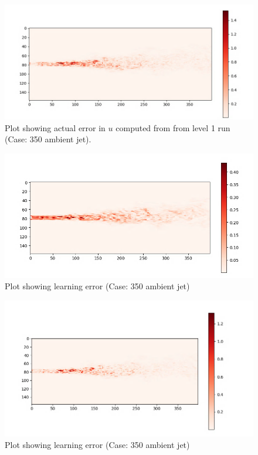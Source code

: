 \documentclass{article}
\begin{document}
\begin{figure}[h!]
    \centering
    \includegraphics[width =0.85\linewidth]{figures/314_01_12_350_12_actual.png}
    \caption{Plot showing actual error in $u$ computed from from level 1 run (Case: 350 ambient jet).}
    \label{amr_err}
\end{figure}

\begin{figure}[h!]
    \centering
    \includegraphics[width = 0.9\linewidth]{figures/314_01_12_350_12_pred.png}
    \caption{Plot showing learning error (Case: 350 ambient jet)}
    \label{amr_err}
\end{figure}

\begin{figure}[h!]
    \centering
    \includegraphics[width = 0.9\linewidth]{figures/314_01_12_350_12_error.png}
    \caption{Plot showing learning error (Case: 350 ambient jet)}
    \label{amr_err}
\end{figure}
\end{document}
